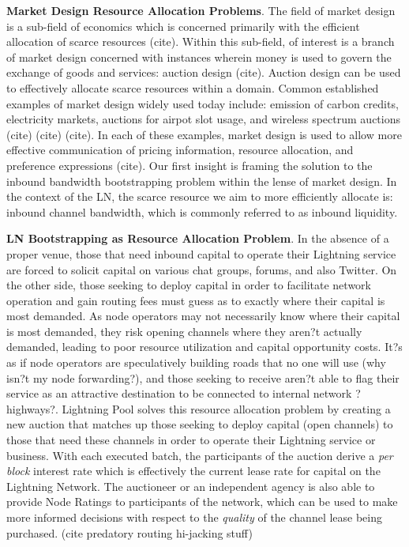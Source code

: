 \documentclass[12pt,a4paper]{article}
\theoremstyle{definition}
\begin{document}
\textbf{Market Design Resource Allocation Problems}. The field of market design
is a sub-field of economics which is concerned primarily with the efficient
allocation of scarce resources (cite). Within this sub-field, of interest is a
branch of market design concerned with instances wherein money is used to
govern the exchange of goods and services: auction design (cite). Auction
design can be used to effectively allocate scarce resources within a domain.
Common established examples of market design widely used today include:
emission of carbon credits, electricity markets, auctions for airpot slot
usage, and wireless spectrum auctions (cite) (cite) (cite). In each of these
examples, market design is used to allow more effective communication of
pricing information, resource allocation, and preference expressions (cite).
Our first insight is framing the solution to the inbound bandwidth
bootstrapping problem within the lense of market design. In the context of the
LN, the scarce resource we aim to more efficiently allocate is: inbound channel
bandwidth, which is commonly referred to as inbound liquidity.

\textbf{LN Bootstrapping as Resource Allocation Problem}. In the absence of a
proper venue, those that need inbound capital to operate their Lightning
service are forced to solicit capital on various chat groups, forums, and also
Twitter. On the other side, those seeking to deploy capital in order to
facilitate network operation and gain routing fees must guess as to exactly
where their capital is most demanded. As node operators may not necessarily
know where their capital is most demanded, they risk opening channels where
they aren?t actually demanded, leading to poor resource utilization and capital
opportunity costs. It?s as if node operators are speculatively building roads
that no one will use (why isn?t my node forwarding?), and those seeking to
receive aren?t able to flag their service as an attractive destination to be
connected to internal network ?highways?. Lightning Pool solves this resource
allocation problem by creating a new auction that matches up those seeking to
deploy capital (open channels) to those that need these channels in order to
operate their Lightning service or business. With each executed batch, the
participants of the auction derive a \emph{per block} interest rate which is
effectively the current lease rate for capital on the Lightning Network. The
auctioneer or an independent agency is also able to provide Node Ratings to
participants of the network, which can be used to make more informed decisions
with respect to the \emph{quality} of the channel lease being purchased. (cite
predatory routing hi-jacking stuff)
\end{document}

